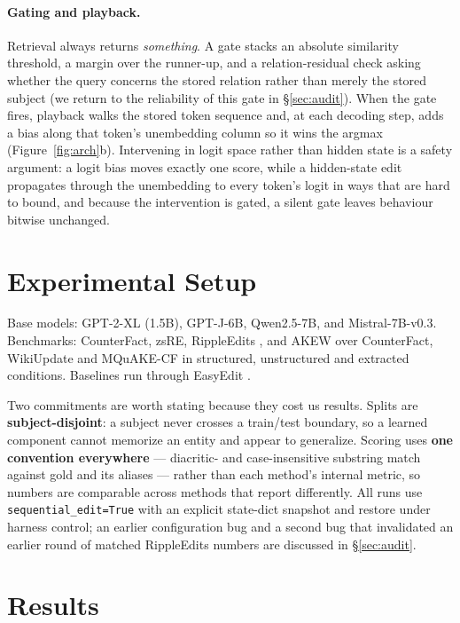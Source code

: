 \documentclass{article}
\begin{document}
\paragraph{Gating and playback.}
Retrieval always returns \emph{something}. A gate stacks an absolute
similarity threshold, a margin over the runner-up, and a relation-residual
check asking whether the query concerns the stored relation rather than
merely the stored subject (we return to the reliability of this gate in
\S\ref{sec:audit}). When the gate fires, playback walks the stored token
sequence and, at each decoding step, adds a bias along that token's
unembedding column so it wins the argmax (Figure~\ref{fig:arch}b).
Intervening in logit space rather than hidden state is a safety argument: a
logit bias moves exactly one score, while a hidden-state edit propagates
through the unembedding to every token's logit in ways that are hard to
bound, and because the intervention is gated, a silent gate leaves behaviour
bitwise unchanged.

\section{Experimental Setup}
\label{sec:setup}

Base models: GPT-2-XL (1.5B), GPT-J-6B, Qwen2.5-7B, and Mistral-7B-v0.3.
Benchmarks: CounterFact, zsRE, RippleEdits \citep{cohen2024ripple}, and AKEW
\citep{wu2024akew} over CounterFact, WikiUpdate and MQuAKE-CF in structured,
unstructured and extracted conditions. Baselines run through EasyEdit
\citep{wang2023easyedit}.

Two commitments are worth stating because they cost us results. Splits are
\textbf{subject-disjoint}: a subject never crosses a train/test boundary, so
a learned component cannot memorize an entity and appear to generalize.
Scoring uses \textbf{one convention everywhere} --- diacritic- and
case-insensitive substring match against gold and its aliases --- rather
than each method's internal metric, so numbers are comparable across
methods that report differently. All runs use \texttt{sequential\_edit=True}
with an explicit state-dict snapshot and restore under harness control; an
earlier configuration bug and a second bug that invalidated an earlier round
of matched RippleEdits numbers are discussed in \S\ref{sec:audit}.

\section{Results}
\label{sec:results}
\end{document}

